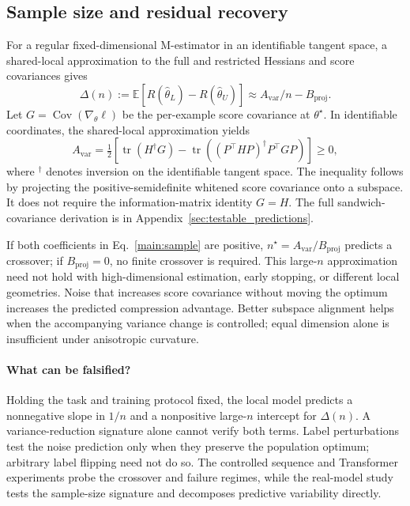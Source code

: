 \subsection{Sample size and residual recovery}
For a regular fixed-dimensional M-estimator in an identifiable tangent space, a shared-local approximation to the full and restricted Hessians and score covariances gives
\begin{equation}
 \Delta(n):=\mathbb E[R(\hat\theta_L)-R(\hat\theta_U)]
 \approx A_{\mathrm{var}}/n-B_{\mathrm{proj}}.
 \label{main:sample}
\end{equation}
Let $G=\operatorname{Cov}(\nabla_\theta\ell)$ be the per-example score covariance at $\theta^\star$. In identifiable coordinates, the shared-local approximation yields
\begin{equation}
 A_{\mathrm{var}}=\tfrac12\left[\operatorname{tr}(H^\dagger G)
 -\operatorname{tr}\!\left((P^\top HP)^\dagger P^\top GP\right)\right]\ge0,
 \label{main:avar}
\end{equation}
where ${}^\dagger$ denotes inversion on the identifiable tangent space. The inequality follows by projecting the positive-semidefinite whitened score covariance onto a subspace. It does not require the information-matrix identity $G=H$. The full sandwich-covariance derivation is in Appendix~\ref{sec:testable_predictions}.

If both coefficients in Eq.~\eqref{main:sample} are positive, $n^\star=A_{\mathrm{var}}/B_{\mathrm{proj}}$ predicts a crossover; if $B_{\mathrm{proj}}=0$, no finite crossover is required. This large-$n$ approximation need not hold with high-dimensional estimation, early stopping, or different local geometries. Noise that increases score covariance without moving the optimum increases the predicted compression advantage. Better subspace alignment helps when the accompanying variance change is controlled; equal dimension alone is insufficient under anisotropic curvature.

\paragraph{What can be falsified?}
Holding the task and training protocol fixed, the local model predicts a nonnegative slope in $1/n$ and a nonpositive large-$n$ intercept for $\Delta(n)$. A variance-reduction signature alone cannot verify both terms. Label perturbations test the noise prediction only when they preserve the population optimum; arbitrary label flipping need not do so. The controlled sequence and Transformer experiments probe the crossover and failure regimes, while the real-model study tests the sample-size signature and decomposes predictive variability directly.

